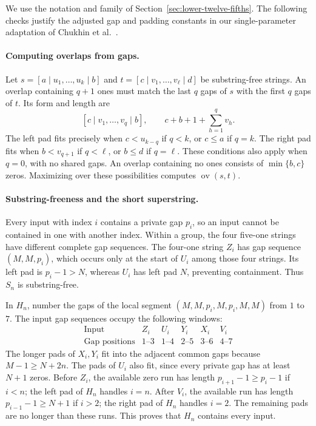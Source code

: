 \documentclass[11pt,a4paper]{article}   %
\theoremstyle{compact}
\theoremstyle{compactdef}
\newcommand{\ov}{\operatorname{ov}}         %
\begin{document}
We use the notation and family of Section~\ref{sec:lower-twelve-fifths}.
The following checks justify the adjusted gap and padding constants in
our single-parameter adaptation of Chukhin et al.~\cite{GSC26}.

\paragraph{Computing overlaps from gaps.}
Let $s=[a\mid u_1,\ldots,u_k\mid b]$ and
$t=[c\mid v_1,\ldots,v_\ell\mid d]$ be substring-free strings.
An overlap containing $q+1$ ones must match the last $q$ gaps of $s$
with the first $q$ gaps of $t$. Its form and length are
\[
 [c\mid v_1,\ldots,v_q\mid b],
 \qquad c+b+1+\sum_{h=1}^qv_h.
\]
The left pad fits precisely when $c<u_{k-q}$ if $q<k$, or $c\le a$ if
$q=k$. The right pad fits when $b<v_{q+1}$ if $q<\ell$, or $b\le d$
if $q=\ell$. These conditions also apply when $q=0$, with no shared
gaps. An overlap containing no ones consists of $\min\{b,c\}$ zeros.
Maximizing over these possibilities computes $\ov(s,t)$.

\paragraph{Substring-freeness and the short superstring.}
Every input with index $i$ contains a private gap $p_i$, so an input
cannot be contained in one with another index. Within a group, the four
five-one strings have different complete gap sequences. The four-one
string $Z_i$ has gap sequence $(M,M,p_i)$, which occurs only at the start
of $U_i$ among those four strings. Its left pad is $p_i-1>N$, whereas
$U_i$ has left pad $N$, preventing containment. Thus $S_n$ is
substring-free.

In $H_n$, number the gaps of the local segment
$(M,M,p_i,M,p_i,M,M)$ from $1$ to $7$. The input gap sequences occupy
the following windows:
\[
 \begin{array}{c|ccccc}
 \text{Input}&Z_i&U_i&Y_i&X_i&V_i\\ \hline
 \text{Gap positions}&1\text{--}3&1\text{--}4&
 2\text{--}5&3\text{--}6&4\text{--}7
 \end{array}
\]
The longer pads of $X_i,Y_i$ fit into the adjacent common gaps because
$M-1\ge N+2n$. The pads of $U_i$ also fit, since every private gap has
at least $N+1$ zeros. Before $Z_i$, the available zero run has length
$p_{i+1}-1\ge p_i-1$ if $i<n$; the left pad of $H_n$ handles $i=n$.
After $V_i$, the available run has length $p_{i-1}-1\ge N+1$ if $i>2$;
the right pad of $H_n$ handles $i=2$. The remaining pads are no longer
than these runs. This proves that $H_n$ contains every input.
\end{document}
